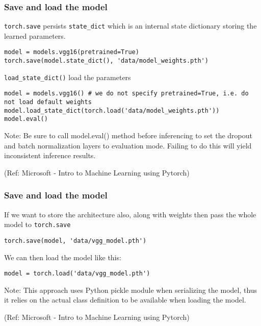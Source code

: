 \begin{frame}[fragile] \frametitle{Save and load the model}

\lstinline|torch.save| persists \lstinline|state_dict| which is an internal state dictionary storing the learned parameters.

\begin{lstlisting}
model = models.vgg16(pretrained=True)
torch.save(model.state_dict(), 'data/model_weights.pth')
\end{lstlisting}

\lstinline|load_state_dict()| load the parameters 

\begin{lstlisting}
model = models.vgg16() # we do not specify pretrained=True, i.e. do not load default weights
model.load_state_dict(torch.load('data/model_weights.pth'))
model.eval()
\end{lstlisting}

Note: Be sure to call model.eval() method before inferencing to set the dropout and batch normalization layers to evaluation mode. Failing to do this will yield inconsistent inference results.

\tiny{(Ref: Microsoft - Intro to Machine Learning using Pytorch)}
\end{frame}


\begin{frame}[fragile] \frametitle{Save and load the model}

If we want to store the architecture also, along with weights then pass the whole model to \lstinline|torch.save|

\begin{lstlisting}
torch.save(model, 'data/vgg_model.pth')
\end{lstlisting}

We can then load the model like this:

\begin{lstlisting}
model = torch.load('data/vgg_model.pth')
\end{lstlisting}

Note: This approach uses Python pickle module when serializing the model, thus it relies on the actual class definition to be available when loading the model.

\tiny{(Ref: Microsoft - Intro to Machine Learning using Pytorch)}
\end{frame}

